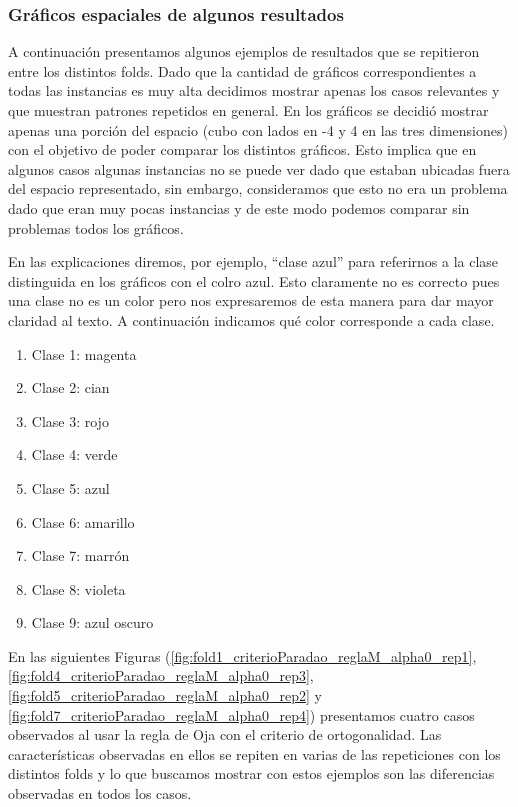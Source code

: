 \documentclass[informe.tex]{subfiles}
\begin{document}
	
      \subsubsection{Gráficos espaciales de algunos resultados}
	A continuación presentamos algunos ejemplos de resultados que se repitieron entre los distintos folds. Dado que la cantidad de gr\'aficos correspondientes a todas las instancias es muy alta decidimos mostrar apenas los casos relevantes y que muestran patrones repetidos en general. En los gráficos se decidió mostrar apenas una porción del espacio (cubo con lados en -4 y 4 en las tres dimensiones) con el objetivo de poder comparar los distintos gr\'aficos. Esto implica que en algunos casos algunas instancias no se puede ver dado que estaban ubicadas fuera del espacio representado, sin embargo, consideramos que esto no era un problema dado que eran muy pocas instancias y de este modo podemos comparar sin problemas todos los gr\'aficos.
	
	En las explicaciones diremos, por ejemplo, ``clase azul'' para referirnos a la clase distinguida en los gráficos con el colro azul. Esto claramente no es correcto pues una clase no es un color pero nos expresaremos de esta manera para dar mayor claridad al texto. A continuación indicamos qué color corresponde a cada clase.
	
	\begin{enumerate}
	  \item Clase 1: magenta
	  \item Clase 2: cian
	  \item Clase 3: rojo
	  \item Clase 4: verde
	  \item Clase 5: azul
	  \item Clase 6: amarillo
	  \item Clase 7: marrón
	  \item Clase 8: violeta
	  \item Clase 9: azul oscuro
	\end{enumerate}

	
	
	
	En las siguientes Figuras (\ref{fig:fold1_criterioParadao_reglaM_alpha0_rep1}, \ref{fig:fold4_criterioParadao_reglaM_alpha0_rep3}, \ref{fig:fold5_criterioParadao_reglaM_alpha0_rep2} y \ref{fig:fold7_criterioParadao_reglaM_alpha0_rep4}) presentamos cuatro casos observados al usar la regla de Oja con el criterio de ortogonalidad. Las características observadas en ellos se repiten en varias de las repeticiones con los distintos folds y lo que buscamos mostrar con estos ejemplos son las diferencias observadas en todos los casos.
	
\end{document}
